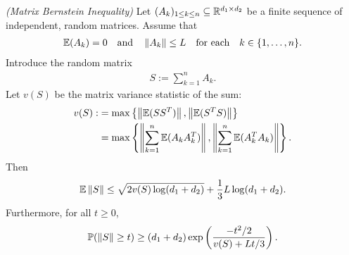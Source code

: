\begin{theorem}
  \emph{(Matrix Bernstein Inequality)}
  \label{rmineq_bernstein}
  Let $(A_k)_{1\le k \le n}\subseteq\mathbb{R}^{d_1\times d_2}$ be a finite sequence of independent, random matrices. Assume that
    \begin{gather}
      \label{rmineq_bernstein_cond_1}
      \mathbb{E}(A_k)=0\quad\text{and}\quad\left\lVert A_k\right\rVert\le L \quad \text{for each}\quad  k\in \{1,\ldots,n\}.
    \end{gather}
    Introduce the random matrix
      \begin{gather*}
        S:=\sum_{k=1}^n A_k.
      \end{gather*}
    Let $v(S)$ be the matrix variance statistic of the sum:
      \begin{align}
        \label{rmineq_bernstein_cond_2}
        \begin{split}
        v(S):&=\max\left\{ \left\lVert\mathbb{E}(SS^T)\right\rVert, \left\lVert\mathbb{E}(S^T S)\right\rVert \right\}\\
             &=\max\left\{ \left\lVert\sum_{k=1}^n\mathbb{E}(A_kA_k^T)\right\rVert, \left\lVert\sum_{k=1}^n\mathbb{E}(A_k^T A_k)\right\rVert \right\}.
        \end{split}
      \end{align}
    Then
      \begin{align}
        \label{rmineq_bernstein_expectation_bound}
        \mathbb{E}\left\lVert S\right\rVert\le \sqrt{2v(S)\log(d_1+d_2)} + \frac{1}{3}L\log(d_1+d_2).
      \end{align}
    Furthermore, for all $t\ge 0$,
      \begin{gather}
        \label{rmineq_bernstein_probability_bound}
        \mathbb{P}(\left\lVert S\right\rVert\ge t)\ge(d_1+d_2)\exp\left(\frac{-t^2/2}{v(S)+Lt/3} \right).
      \end{gather}
\end{theorem}
